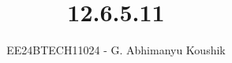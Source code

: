 \documentclass[journal]{IEEEtran}
\begin{document}

\vspace{3cm}

\title{12.6.5.11}
\author{EE24BTECH11024 - G. Abhimanyu Koushik}
{\let\newpage\relax\maketitle}

\renewcommand{\thefigure}{\theenumi}
\renewcommand{\thetable}{\theenumi}
\setlength{\intextsep}{10pt} %


\renewcommand{\thetable}{\theenumi}
\end{document}
